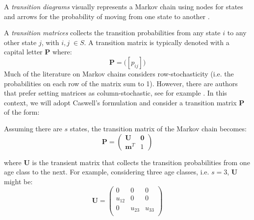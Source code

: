 \documentclass[\main/main.tex]{subfiles}
\begin{document}
A \textit{transition diagrams} visually represents a Markov chain using nodes for states and arrows for the probability of moving from one state to another \citep{Gagniuc2017}. 

A \textit{transition matrices} collects the transition probabilities from any state $i$ to any other state $j$, with $i,j \; \in S$. A transition matrix is typically denoted with a capital letter $\mathbf{P}$ where:
\begin{equation}
    \mathbf{P} = \Big( [p_{ij}] \Big)
\end{equation}
Much of the literature on Markov chains considers row-stochasticity (i.e. the probabilities on each row of the matrix sum to 1). However, there are authors that prefer setting matrices as column-stochastic, see for example \cite{Caswell2006}. In this context, we will adopt Caswell's formulation and consider a transition matrix $\mathbf{P}$ of the form:


\begin{center}
\end{center}



Assuming there are $s$ states, the transition matrix of the Markov chain becomes:
\begin{equation}
    \mathbf{P} = \begin{pmatrix}
        \mathbf{U} &  \mathbf{0}\\
    \mathbf{m}^T& 1
    \end{pmatrix}
\end{equation}

where $\mathbf{U}$ is the transient matrix that collects the transition probabilities from one age class to the next. For example, considering three age classes, i.e. $s = 3$, $\mathbf{U}$ might be:
\begin{equation}
    \mathbf{U}= \begin{pmatrix}
    0 & 0 & 0\\
    u_{12} & 0 & 0\\
0 & u_{23} & u_{33}\\
    \end{pmatrix}
\end{equation}
\end{document}
